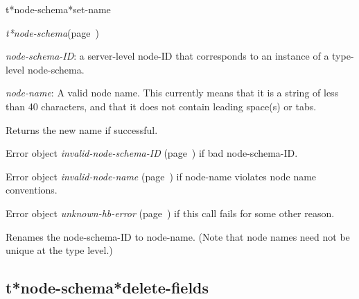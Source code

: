 \begin{description}
\item [Name:]  t*node-schema*set-name

\item [Class:] {\sl t*node-schema}\hfill(page~\pageref{t*node-schema})

\item [Parameters:]
\item {\sl node-schema-ID}:  a server-level node-ID that corresponds to an 
instance of a type-level node-schema. 


\item {\sl node-name}:  
A valid node name. This currently means that it is a
string of less than 40 characters, and that it does
not contain leading space(s) or tabs.


\item [Return-value:]
Returns the new name if successful.

Error object {\sl invalid-node-schema-ID} (page~\pageref{invalid-node-schema-ID}) if bad 
node-schema-ID. 

Error object {\sl invalid-node-name} (page~\pageref{invalid-node-name}) if node-name 
violates node name conventions.

Error object {\sl unknown-hb-error} (page~\pageref{unknown-hb-error}) if this call
fails for some other reason.

\item [Description:]
Renames the node-schema-ID to node-name.  
(Note that node names need not be unique at the 
type level.)

\item [Public:]



\end{description}
\horizontalline

\subsection{t*node-schema*delete-fields}
\label{t*node-schema*delete-fields}


